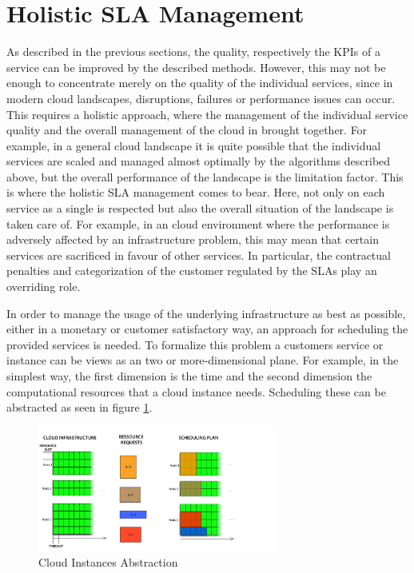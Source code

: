\section{Holistic SLA Management}
As  described in the previous sections, the quality, respectively the KPIs of a service can be improved by the described methods. However, this may not be enough to concentrate merely on the quality of the individual services, since in modern cloud landscapes, disruptions, failures or performance issues can occur. This requires a holistic approach, where the management of the individual service quality and the overall management of the cloud in brought together. For example, in a general cloud landscape it is quite possible that the individual services are scaled and managed almost optimally by the algorithms described above, but the overall performance of the landscape is the limitation factor. This is where the holistic SLA management comes to bear. Here, not only on each service as a single is respected but also the overall situation of the landscape is taken care of. For example, in an cloud environment where the performance is adversely affected by an infrastructure problem, this may mean that certain services are sacrificed in favour of other services. In particular, the contractual penalties and categorization of the customer regulated by the SLAs play an overriding role.

In order to manage the usage of the underlying infrastructure as best as possible, either in a monetary or customer satisfactory way, an approach for scheduling the provided services is needed. To formalize this problem a customers service or instance can be views as an two or more-dimensional plane. For example, in the simplest way, the first dimension is the time and the second dimension the computational resources that a cloud instance needs. Scheduling these  can be abstracted as seen in figure \ref{fig:Holo1}.

\begin{figure}[ht]
	\begin{center}
		\includegraphics[width=0.70\textwidth]{chapters/chapter5/fig/holo1}
	\end{center}
	\caption{Cloud Instances Abstraction}
	\label{fig:Holo1}
\end{figure}

